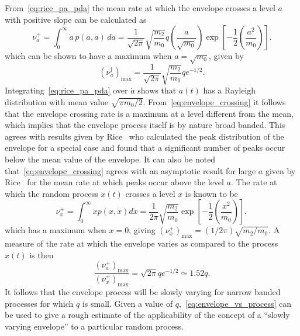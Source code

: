 \documentclass[12pt]{article}
\theoremstyle{plain}
\theoremstyle{definition}
\theoremstyle{remark}
\begin{document}
From~\eqref{eq:rice_pa_pda} the mean rate at which the envelope crosses a level $a$ with positive slope can be calculated as~\cite{lin1967}
\begin{equation}
    \nu_a^+ = \int_0^\infty \dot{a} \, p(a, \dot{a}) \, d\dot{a} = \frac{1}{\sqrt{2\pi}} \sqrt{\frac{m_2}{m_0}} q \left( \frac{a}{\sqrt{m_0}} \right) \exp \left[ -\frac{1}{2} \left( \frac{a^2}{m_0} \right) \right].
    \label{eq:envelope_crossing}
\end{equation}
which can be shown to have a maximum when $a = \sqrt{m_0}$, given by
\begin{equation}
    (\nu_a^\dagger)_{\max} = \frac{1}{\sqrt{2\pi}} \sqrt{\frac{m_2}{m_0}} q e^{-1/2}.
    \label{eq:nu_a_max}
\end{equation}
Integrating~\eqref{eq:rice_pa_pda} over $\dot{a}$ shows that $a(t)$ has a Rayleigh distribution with mean value $\sqrt{\pi m_0 / 2}$. From~\eqref{eq:envelope_crossing} it follows that the envelope crossing rate is a maximum at a level different from the mean, which implies that the envelope process itself is by nature broad banded. This agrees with results given by Rice~\cite{rice1954} who calculated the peak distribution of the envelope for a special case and found that a significant number of peaks occur below the mean value of the envelope. It can also be noted that~\eqref{eq:envelope_crossing} agrees with an asymptotic result for large $a$ given by Rice~\cite{rice1954} for the mean rate at which peaks occur above the level $a$. The rate at which the random process $x(t)$ crosses a level $x$ is known to be
\begin{equation}
    \nu_x^+ = \int_0^\infty \dot{x} p(x, \dot{x}) d\dot{x} = \frac{1}{2\pi} \sqrt{\frac{m_2}{m_0}} \exp \left[ -\frac{1}{2} \left( \frac{x^2}{m_0} \right) \right],
    \label{eq:process_crossing}
\end{equation}
which has a maximum when $x=0$, giving $(\nu_x^+)_{\max} = (1/2\pi) \sqrt{m_2 / m_0}$. A measure of the rate at which the envelope varies as compared to the process $x(t)$ is then
\begin{equation}
    \frac{(\nu_a^+)_{\max}}{(\nu_x^+)_{\max}} = \sqrt{2\pi} q e^{-1/2} \simeq 1.52 q.
    \label{eq:envelope_vs_process}
\end{equation}
It follows that the envelope process will be slowly varying for narrow banded processes for which $q$ is small. Given a value of $q$,~\eqref{eq:envelope_vs_process} can be used to give a rough estimate of the applicability of the concept of a ``slowly varying envelope'' to a particular random process.
\end{document}
